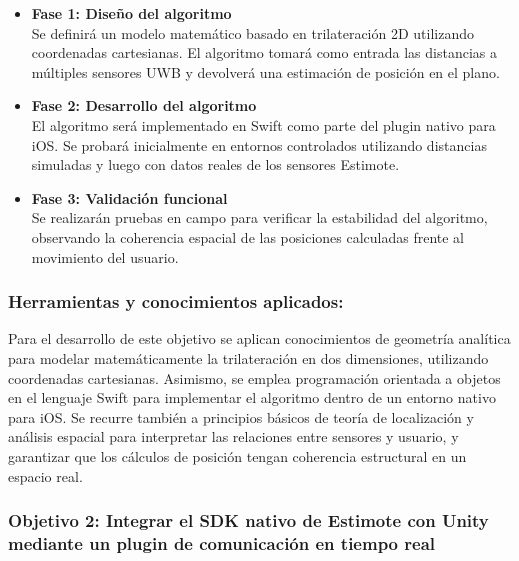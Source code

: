 \begin{itemize}
    \item \textbf{Fase 1: Diseño del algoritmo} \\
    Se definirá un modelo matemático basado en trilateración 2D utilizando coordenadas cartesianas. El algoritmo tomará como entrada las distancias a múltiples sensores UWB y devolverá una estimación de posición en el plano.

    \item \textbf{Fase 2: Desarrollo del algoritmo} \\
    El algoritmo será implementado en Swift como parte del plugin nativo para iOS. Se probará inicialmente en entornos controlados utilizando distancias simuladas y luego con datos reales de los sensores Estimote.

    \item \textbf{Fase 3: Validación funcional} \\
    Se realizarán pruebas en campo para verificar la estabilidad del algoritmo, observando la coherencia espacial de las posiciones calculadas frente al movimiento del usuario.
\end{itemize}

\subsubsection{Herramientas y conocimientos aplicados:} Para el desarrollo de este objetivo se aplican {\justify conocimientos de geometría analítica para modelar matemáticamente la trilateración en dos dimensiones, utilizando coordenadas cartesianas. Asimismo, se emplea programación orientada a objetos en el lenguaje Swift para implementar el algoritmo dentro de un entorno nativo para iOS. Se recurre también a principios básicos de teoría de localización y análisis espacial para interpretar las relaciones entre sensores y usuario, y garantizar que los cálculos de posición tengan coherencia estructural en un espacio real.}

\subsubsection{Objetivo 2: Integrar el SDK nativo de Estimote con Unity mediante un plugin de comunicación en tiempo real}

